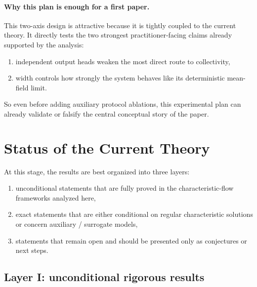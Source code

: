 \documentclass[11pt]{article}
\theoremstyle{definition}
\begin{document}
\paragraph{Why this plan is enough for a first paper.}
This two-axis design is attractive because it is tightly coupled to the current theory.
It directly tests the two strongest practitioner-facing claims already supported by the analysis:
\begin{enumerate}[leftmargin=2em]
  \item independent output heads weaken the most direct route to collectivity,
  \item width controls how strongly the system behaves like its deterministic mean-field limit.
\end{enumerate}
So even before adding auxiliary protocol ablations,
this experimental plan can already validate or falsify the central conceptual story of the paper.

\section{Status of the Current Theory}

At this stage, the results are best organized into three layers:
\begin{enumerate}[leftmargin=2em]
  \item unconditional statements that are fully proved in the characteristic-flow frameworks analyzed here,
  \item exact statements that are either conditional on regular characteristic solutions or concern auxiliary / surrogate models,
  \item statements that remain open and should be presented only as conjectures or next steps.
\end{enumerate}

\subsection{Layer I: unconditional rigorous results}
\end{document}
